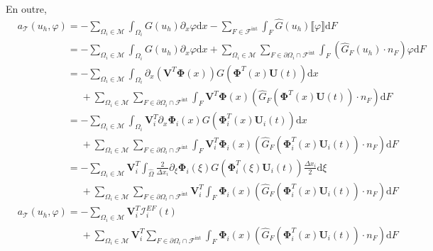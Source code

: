 \documentclass[11pt, a4paper, oneside]{report}
\begin{document}
\noindent
En outre,
\begin{equation}
    \begin{aligned}
        &a_\mathcal{T}(u_h, \varphi) = -\sum_{\Omega_i \in \mathcal{M}} \int_{\Omega_i} G(u_h) \partial_x \varphi \text{d}x - \sum_{F \in \mathcal{F}^\text{int}} \int_F \widehat{G}(u_h) \llbracket \varphi \rrbracket \text{d}F \\
        &\phantom{a_\mathcal{T}(u_h, \varphi) } = -\sum_{\Omega_i \in \mathcal{M}} \int_{\Omega_i} G(u_h) \partial_x \varphi \text{d}x + \sum_{\Omega_i \in \mathcal{M}} \sum_{F \in \partial \Omega_i \cap \mathcal{F}^\text{int}} \int_F (\widehat{G}_F(u_h) \cdot n_F) \varphi \text{d}F \\
        &\phantom{a_\mathcal{T}(u_h, \varphi) } = -\sum_{\Omega_i \in \mathcal{M}} \int_{\Omega_i} \partial_x \left( \bm{V}^T \bm{\Phi}(x) \right) G \left( \bm{\Phi}^T(x) \bm{U}(t) \right) \text{d}x \\
        &\phantom{a_\mathcal{T}(u_h, \varphi) =} +\sum_{\Omega_i \in \mathcal{M}} \sum_{F \in \partial \Omega_i \cap \mathcal{F}^\text{int}} \int_F \bm{V}^T \bm{\Phi}(x) \left( \widehat{G}_F \left( \bm{\Phi}^T(x) \bm{U}(t) \right) \cdot n_F \right) \text{d}F \\
        &\phantom{a_\mathcal{T}(u_h, \varphi) } = -\sum_{\Omega_i \in \mathcal{M}} \int_{\Omega_i} \bm{V}_i^T \partial_x \bm{\Phi}_i(x) G \left( \bm{\Phi}_i^T(x) \bm{U}_i(t) \right) \text{d}x \\
        &\phantom{a_\mathcal{T}(u_h, \varphi) =} +\sum_{\Omega_i \in \mathcal{M}} \sum_{F \in \partial \Omega_i \cap \mathcal{F}^\text{int}} \int_F \bm{V}_i^T \bm{\Phi}_i(x) \left( \widehat{G}_F \left( \bm{\Phi}_i^T(x) \bm{U}_i(t) \right) \cdot n_F \right) \text{d}F \\
        &\phantom{a_\mathcal{T}(u_h, \varphi) } = -\sum_{\Omega_i \in \mathcal{M}} \bm{V}_i^T \int_{\widehat{\Omega}} \frac{2}{\Delta x_i} \partial_\xi \bm{\Phi}_i(\xi) G \left( \bm{\Phi}_i^T(\xi) \bm{U}_i(t) \right) \frac{\Delta x_i}{2} \text{d}\xi \\
        &\phantom{a_\mathcal{T}(u_h, \varphi) =} +\sum_{\Omega_i \in \mathcal{M}} \sum_{F \in \partial \Omega_i \cap \mathcal{F}^\text{int}} \bm{V}_i^T \int_F \bm{\Phi}_i(x) \left( \widehat{G}_F \left( \bm{\Phi}_i^T(x) \bm{U}_i(t) \right) \cdot n_F \right) \text{d}F \\
        &a_\mathcal{T}(u_h, \varphi) = - \sum_{\Omega_i \in \mathcal{M}} \bm{V}_i^T \bm{\mathcal{I}}_i^{EF}(t) \\
        &\phantom{a_\mathcal{T}(u_h, \varphi) =} + \sum_{\Omega_i \in \mathcal{M}} \bm{V}_i^T \sum_{F \in \partial \Omega_i \cap \mathcal{F}^\text{int}} \int_F \bm{\Phi}_i(x) \left( \widehat{G}_F \left( \bm{\Phi}_i^T(x) \bm{U}_i(t) \right) \cdot n_F \right) \text{d}F
    \end{aligned}
\end{equation}
\end{document}
